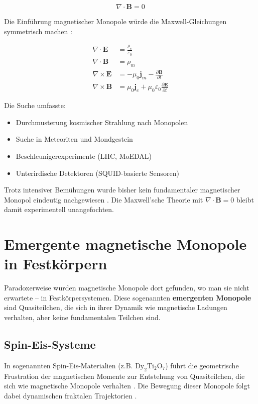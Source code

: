 \[
\nabla \cdot \mathbf{B} = 0
\]

Die Einführung magnetischer Monopole würde die Maxwell-Gleichungen symmetrisch machen \cite{Maxwell1873}:

\[
\begin{aligned}
\nabla \cdot \mathbf{E} &= \frac{\rho_e}{\varepsilon_0} \\
\nabla \cdot \mathbf{B} &= \rho_m \\
\nabla \times \mathbf{E} &= -\mu_0 \mathbf{j}_m - \frac{\partial \mathbf{B}}{\partial t} \\
\nabla \times \mathbf{B} &= \mu_0 \mathbf{j}_e + \mu_0 \varepsilon_0 \frac{\partial \mathbf{E}}{\partial t}
\end{aligned}
\]

Die Suche umfasste:
\begin{itemize}
    \item Durchmusterung kosmischer Strahlung nach Monopolen
    \item Suche in Meteoriten und Mondgestein
    \item Beschleunigerexperimente (LHC, MoEDAL)
    \item Unterirdische Detektoren (SQUID-basierte Sensoren)
\end{itemize}

Trotz intensiver Bemühungen wurde bisher kein fundamentaler magnetischer Monopol eindeutig nachgewiesen \cite{Assis2005, Assis2012}. Die Maxwell'sche Theorie mit $\nabla \cdot \mathbf{B} = 0$ bleibt damit experimentell unangefochten.

\section{Emergente magnetische Monopole in Festkörpern}
\label{app:monopolforschung_emergent}

Paradoxerweise wurden magnetische Monopole dort gefunden, wo man sie nicht erwartete – in Festkörpersystemen. Diese sogenannten \textbf{emergenten Monopole} sind Quasiteilchen, die sich in ihrer Dynamik wie magnetische Ladungen verhalten, aber keine fundamentalen Teilchen sind.

\subsection{Spin-Eis-Systeme}
\label{app:monopolforschung_spin_ice}

In sogenannten Spin-Eis-Materialien (z.B. $\mathrm{Dy_2Ti_2O_7}$) führt die geometrische Frustration der magnetischen Momente zur Entstehung von Quasiteilchen, die sich wie magnetische Monopole verhalten \cite{Castelnovo2008}. Die Bewegung dieser Monopole folgt dabei dynamischen fraktalen Trajektorien \cite{Hallen2022}.

